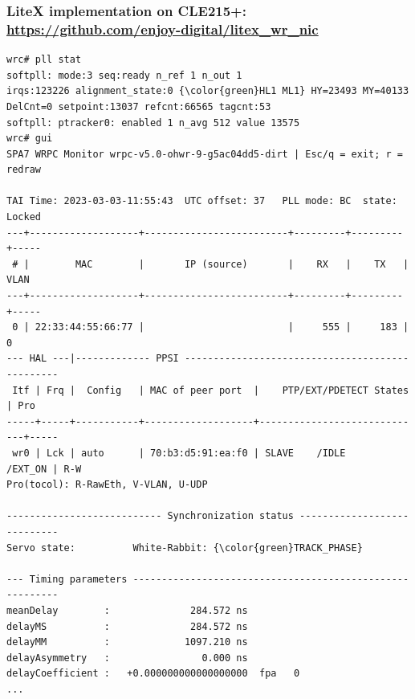 \documentclass[compress,10pt,aspectratio=169]{beamer}
\begin{document}
\begin{frame}[fragile]\frametitle{LiteX implementation on CLE215+: {\footnotesize\url{https://github.com/enjoy-digital/litex_wr_nic}}}

{\scriptsize
\begin{Verbatim}[commandchars=\\\{\}]
wrc# pll stat
softpll: mode:3 seq:ready n_ref 1 n_out 1
irqs:123226 alignment_state:0 {\color{green}HL1 ML1} HY=23493 MY=40133 DelCnt=0 setpoint:13037 refcnt:66565 tagcnt:53
softpll: ptracker0: enabled 1 n_avg 512 value 13575
wrc# gui
SPA7 WRPC Monitor wrpc-v5.0-ohwr-9-g5ac04dd5-dirt | Esc/q = exit; r = redraw

TAI Time: 2023-03-03-11:55:43  UTC offset: 37   PLL mode: BC  state: Locked
---+-------------------+-------------------------+---------+---------+-----
 # |        MAC        |       IP (source)       |    RX   |    TX   | VLAN
---+-------------------+-------------------------+---------+---------+-----
 0 | 22:33:44:55:66:77 |                         |     555 |     183 |    0
--- HAL ---|------------- PPSI ------------------------------------------------
 Itf | Frq |  Config   | MAC of peer port  |    PTP/EXT/PDETECT States   | Pro 
-----+-----+-----------+-------------------+-----------------------------+-----
 wr0 | Lck | auto      | 70:b3:d5:91:ea:f0 | SLAVE    /IDLE      /EXT_ON | R-W 
Pro(tocol): R-RawEth, V-VLAN, U-UDP

--------------------------- Synchronization status ----------------------------
Servo state:          White-Rabbit: {\color{green}TRACK_PHASE}

--- Timing parameters ---------------------------------------------------------
meanDelay        :              284.572 ns
delayMS          :              284.572 ns 
delayMM          :             1097.210 ns 
delayAsymmetry   :                0.000 ns
delayCoefficient :   +0.000000000000000000  fpa   0
...
\end{Verbatim}
}
\end{frame}
\end{document}
